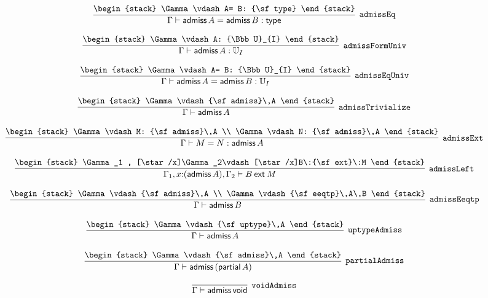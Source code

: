 \[
\infer[{\tt admissEq}]{\Gamma \vdash {\sf admiss}\,A= {\sf admiss}\,B: {\sf type}}{
\begin{stack}
\Gamma \vdash A= B: {\sf type}
\end{stack}}
\]

\[
\infer[{\tt admissFormUniv}]{\Gamma \vdash {\sf admiss}\,A: {\Bbb U}_{I}}{
\begin{stack}
\Gamma \vdash A: {\Bbb U}_{I}
\end{stack}}
\]

\[
\infer[{\tt admissEqUniv}]{\Gamma \vdash {\sf admiss}\,A= {\sf admiss}\,B: {\Bbb U}_{I}}{
\begin{stack}
\Gamma \vdash A= B: {\Bbb U}_{I}
\end{stack}}
\]

\[
\infer[{\tt admissTrivialize}]{\Gamma \vdash {\sf admiss}\,A}{
\begin{stack}
\Gamma \vdash {\sf admiss}\,A
\end{stack}}
\]

\[
\infer[{\tt admissExt}]{\Gamma \vdash M= N: {\sf admiss}\,A}{
\begin{stack}
\Gamma \vdash M: {\sf admiss}\,A
\\
\Gamma \vdash N: {\sf admiss}\,A
\end{stack}}
\]

\[
\infer[{\tt admissLeft}]{\Gamma_1 ,x\mathord{:}({\sf admiss}\,A), \Gamma_2 \vdash B\:{\sf ext}\:M}{
\begin{stack}
\Gamma_1 , [\star /x]\Gamma_2\vdash [\star /x]B\:{\sf ext}\:M
\end{stack}}
\]

\[
\infer[{\tt admissEeqtp}]{\Gamma \vdash {\sf admiss}\,B}{
\begin{stack}
\Gamma \vdash {\sf admiss}\,A
\\
\Gamma \vdash {\sf eeqtp}\,A\,B
\end{stack}}
\]

\[
\infer[{\tt uptypeAdmiss}]{\Gamma \vdash {\sf admiss}\,A}{
\begin{stack}
\Gamma \vdash {\sf uptype}\,A
\end{stack}}
\]

\[
\infer[{\tt partialAdmiss}]{\Gamma \vdash {\sf admiss}\,({\sf partial}\,A)}{
\begin{stack}
\Gamma \vdash {\sf admiss}\,A
\end{stack}}
\]

\[
\infer[{\tt voidAdmiss}]{\Gamma \vdash {\sf admiss}\,{\sf void}}{}
\]

